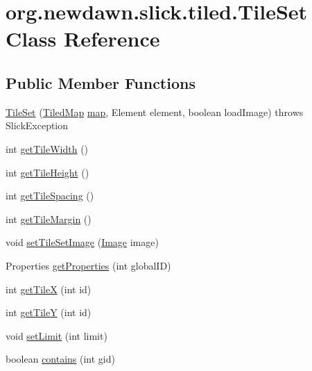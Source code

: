 \hypertarget{classorg_1_1newdawn_1_1slick_1_1tiled_1_1_tile_set}{}\section{org.\+newdawn.\+slick.\+tiled.\+Tile\+Set Class Reference}
\label{classorg_1_1newdawn_1_1slick_1_1tiled_1_1_tile_set}
\subsection*{Public Member Functions}
\begin{DoxyCompactItemize}
\item 
\mbox{\hyperlink{classorg_1_1newdawn_1_1slick_1_1tiled_1_1_tile_set_a41d4a7cf74a94b435ad4e5c92fa9ba9b}{Tile\+Set}} (\mbox{\hyperlink{classorg_1_1newdawn_1_1slick_1_1tiled_1_1_tiled_map}{Tiled\+Map}} \mbox{\hyperlink{classorg_1_1newdawn_1_1slick_1_1tiled_1_1_tile_set_a6d8213553283cc2970748811ec170644}{map}}, Element element, boolean load\+Image)  throws Slick\+Exception 
\item 
int \mbox{\hyperlink{classorg_1_1newdawn_1_1slick_1_1tiled_1_1_tile_set_aab39d1236f2bed7845bebc07e6cfc735}{get\+Tile\+Width}} ()
\item 
int \mbox{\hyperlink{classorg_1_1newdawn_1_1slick_1_1tiled_1_1_tile_set_aa74f0092cb827be4c3eed1efdbee66a2}{get\+Tile\+Height}} ()
\item 
int \mbox{\hyperlink{classorg_1_1newdawn_1_1slick_1_1tiled_1_1_tile_set_a0f0f7de2e47871ca036080444fd0801a}{get\+Tile\+Spacing}} ()
\item 
int \mbox{\hyperlink{classorg_1_1newdawn_1_1slick_1_1tiled_1_1_tile_set_a7182432acea55d877c66e1cea4e6f413}{get\+Tile\+Margin}} ()
\item 
void \mbox{\hyperlink{classorg_1_1newdawn_1_1slick_1_1tiled_1_1_tile_set_a06c06564f6695455d57a2260b7d1df09}{set\+Tile\+Set\+Image}} (\mbox{\hyperlink{classorg_1_1newdawn_1_1slick_1_1_image}{Image}} image)
\item 
Properties \mbox{\hyperlink{classorg_1_1newdawn_1_1slick_1_1tiled_1_1_tile_set_a133a935b972264395d06603a8c874be1}{get\+Properties}} (int global\+ID)
\item 
int \mbox{\hyperlink{classorg_1_1newdawn_1_1slick_1_1tiled_1_1_tile_set_aa0db1dfc806d1bba3c0628a761c7265e}{get\+TileX}} (int id)
\item 
int \mbox{\hyperlink{classorg_1_1newdawn_1_1slick_1_1tiled_1_1_tile_set_a09f389ff1e632d4d0d2d1424400aaeaa}{get\+TileY}} (int id)
\item 
void \mbox{\hyperlink{classorg_1_1newdawn_1_1slick_1_1tiled_1_1_tile_set_a4cb59e26a84dd5401a841ff30fc6f34b}{set\+Limit}} (int limit)
\item 
boolean \mbox{\hyperlink{classorg_1_1newdawn_1_1slick_1_1tiled_1_1_tile_set_a1c79857700ca40c4e66034db53c90bed}{contains}} (int gid)
\end{DoxyCompactItemize}
